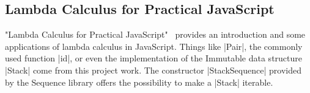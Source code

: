 \subsection{Lambda Calculus for Practical JavaScript} %
\label{sub:Lambda Calculus for Practical JavaScript}
"Lambda Calculus for Practical JavaScript"~\cite{andermatt_lambda_2022}
provides an introduction and some applications of lambda calculus in
JavaScript. Things like |Pair|, the commonly used function |id|, or even the
implementation of the Immutable data structure |Stack| come from this project
work. The constructor |StackSequence| provided by the Sequence library offers
the possibility to make a |Stack| iterable. 
